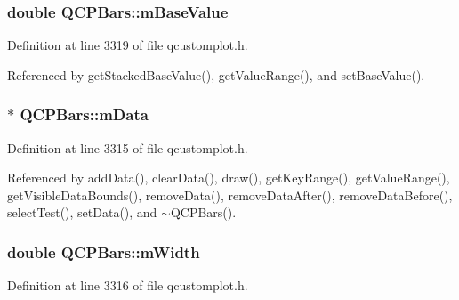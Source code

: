 \hypertarget{class_q_c_p_bars_aa0515cf47fa6044cc28e59b1ae5ec759}{}
\subsubsection[{m\+Base\+Value}]{\setlength{\rightskip}{0pt plus 5cm}double Q\+C\+P\+Bars\+::m\+Base\+Value\hspace{0.3cm}{\ttfamily [protected]}}\label{class_q_c_p_bars_aa0515cf47fa6044cc28e59b1ae5ec759}


Definition at line 3319 of file qcustomplot.\+h.



Referenced by get\+Stacked\+Base\+Value(), get\+Value\+Range(), and set\+Base\+Value().

\hypertarget{class_q_c_p_bars_aef28d29d51ef84b608ecd22c55d531ff}{}
\subsubsection[{m\+Data}]{$\ast$ Q\+C\+P\+Bars\+::m\+Data\hspace{0.3cm}{\ttfamily [protected]}}\label{class_q_c_p_bars_aef28d29d51ef84b608ecd22c55d531ff}


Definition at line 3315 of file qcustomplot.\+h.



Referenced by add\+Data(), clear\+Data(), draw(), get\+Key\+Range(), get\+Value\+Range(), get\+Visible\+Data\+Bounds(), remove\+Data(), remove\+Data\+After(), remove\+Data\+Before(), select\+Test(), set\+Data(), and $\sim$\+Q\+C\+P\+Bars().

\hypertarget{class_q_c_p_bars_a7c4e0f2246f8133f48a9c3f24cf5b920}{}
\subsubsection[{m\+Width}]{\setlength{\rightskip}{0pt plus 5cm}double Q\+C\+P\+Bars\+::m\+Width\hspace{0.3cm}{\ttfamily [protected]}}\label{class_q_c_p_bars_a7c4e0f2246f8133f48a9c3f24cf5b920}


Definition at line 3316 of file qcustomplot.\+h.



